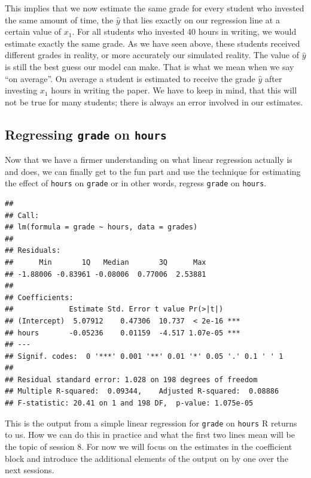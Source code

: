 \documentclass[
]{book}
\begin{document}
This implies that we now estimate the same grade for every student who invested
the same amount of time, the \(\hat{y}\) that lies exactly on our regression line
at a certain value of \(x_1\). For all students who invested \(40\) hours in writing,
we would estimate exactly the same grade. As we have seen above, these students
received different grades in reality, or more accurately our simulated reality.
The value of \(\hat{y}\) is still the best guess our model can make. That is what
we mean when we say ``on average''. On average a student is estimated to receive
the grade \(\hat{y}\) after investing \(x_1\) hours in writing the paper. We have
to keep in mind, that this will not be true for many students; there is always
an error involved in our estimates.

\hypertarget{regressing-grade-on-hours}{%
\subsection{\texorpdfstring{Regressing \texttt{grade} on \texttt{hours}}{Regressing grade on hours}}\label{regressing-grade-on-hours}}

Now that we have a firmer understanding on what linear regression actually is
and does, we can finally get to the fun part and use the technique for
estimating the effect of \texttt{hours} on \texttt{grade} or in other words, regress
\texttt{grade} on \texttt{hours}.

\begin{verbatim}
## 
## Call:
## lm(formula = grade ~ hours, data = grades)
## 
## Residuals:
##      Min       1Q   Median       3Q      Max 
## -1.88006 -0.83961 -0.08006  0.77006  2.53881 
## 
## Coefficients:
##             Estimate Std. Error t value Pr(>|t|)    
## (Intercept)  5.07912    0.47306  10.737  < 2e-16 ***
## hours       -0.05236    0.01159  -4.517 1.07e-05 ***
## ---
## Signif. codes:  0 '***' 0.001 '**' 0.01 '*' 0.05 '.' 0.1 ' ' 1
## 
## Residual standard error: 1.028 on 198 degrees of freedom
## Multiple R-squared:  0.09344,    Adjusted R-squared:  0.08886 
## F-statistic: 20.41 on 1 and 198 DF,  p-value: 1.075e-05
\end{verbatim}

This is the output from a simple linear regression for \texttt{grade} on \texttt{hours} R
returns to us.
How we can do this in practice and what the first two lines mean will be the
topic of session 8. For now we will focus on the estimates in the coefficient
block and introduce the additional elements of the output on by one over the
next sessions.
\end{document}
